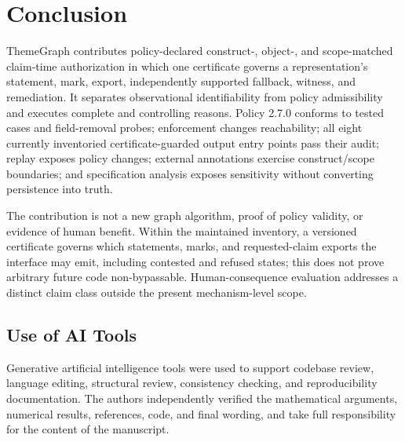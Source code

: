 \documentclass[manuscript,screen,review,anonymous]{acmart}
\begin{document}
\section{Conclusion}

ThemeGraph contributes policy-declared construct-, object-, and scope-matched claim-time authorization in which one certificate governs a representation's statement, mark, export, independently supported fallback, witness, and remediation. It separates observational identifiability from policy admissibility and executes complete and controlling reasons. Policy 2.7.0 conforms to tested cases and field-removal probes; enforcement changes reachability; all eight currently inventoried certificate-guarded output entry points pass their audit; replay exposes policy changes; external annotations exercise construct/scope boundaries; and specification analysis exposes sensitivity without converting persistence into truth.

The contribution is not a new graph algorithm, proof of policy validity, or evidence of human benefit. Within the maintained inventory, a versioned certificate governs which statements, marks, and requested-claim exports the interface may emit, including contested and refused states; this does not prove arbitrary future code non-bypassable. Human-consequence evaluation addresses a distinct claim class outside the present mechanism-level scope.

\subsection{Use of AI Tools}

Generative artificial intelligence tools were used to support codebase review, language editing, structural review, consistency checking, and reproducibility documentation. The authors independently verified the mathematical arguments, numerical results, references, code, and final wording, and take full responsibility for the content of the manuscript.



\end{document}
